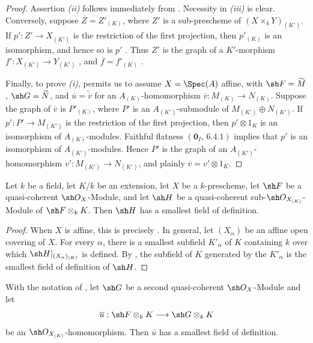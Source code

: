\begin{proof}
Assertion \emph{(ii)} follows immediately from .
Necessity in \emph{(iii)} is clear.
Conversely, suppose
$\overline Z=Z'_{(K)}$, where $Z'$ is a sub-prescheme of
$(X\times_kY)_{(K')}$.
If $p':Z'\to X_{(K')}$ is the restriction of the first projection,
then $p'_{(K)}$ is an isomorphism, and hence so is $p'$
.
Thus $Z'$ is the graph of a $K'$-morphism
$f':X_{(K')}\to Y_{(K')}$ , and
$\overline f=f'_{(K)}$ .

Finally, to prove \emph{(i)},  permits us to assume
$X=\Spec(A)$ affine, with $\sh F=\widetilde M$,
$\sh G=\widetilde N$, and
$\overline u=\widetilde{\overline v}$ for an
$A_{(K)}$-homomorphism
$\overline v:M_{(K)}\to N_{(K)}$.
Suppose the graph of $\overline v$ is
$P'_{(K)}$, where $P'$ is an $A_{(K')}$-submodule of
$M_{(K')}\oplus N_{(K')}$.
If $p':P'\to M_{(K')}$ is the restriction of the first projection,
then $p'\otimes1_K$ is an isomorphism of $A_{(K)}$-modules.
Faithful flatness $(\mathbf 0_I,\,6.4.1)$ implies that $p'$ is an
isomorphism of $A_{(K')}$-modules.
Hence $P'$ is the graph of an $A_{(K')}$-homomorphism
$v':M_{(K')}\to N_{(K')}$, and plainly
$\overline v=v'\otimes1_K$.
\end{proof}

\begin{proposition}[4.8.9]
\label{IV.4.8.9}
Let $k$ be a field, let $K/k$ be an extension, let $X$ be a
$k$-prescheme, let $\sh F$ be a quasi-coherent $\sh O_X$-Module, and
let $\sh H$ be a quasi-coherent sub-$\sh O_{X_{(K)}}$-Module of
$\sh F\otimes_kK$.
Then $\sh H$ has a smallest field of definition.
\end{proposition}

\begin{proof}
When $X$ is affine, this is precisely .
In general, let $(X_\alpha)$ be an affine open covering of $X$.
For every $\alpha$, there is a smallest subfield $K'_\alpha$ of $K$
containing $k$ over which
$\sh H|_{(X_\alpha)_{(K)}}$ is defined.
By , the subfield of $K$ generated by the
$K'_\alpha$ is the smallest field of definition of $\sh H$.
\end{proof}

\begin{corollary}[4.8.10]
\label{IV.4.8.10}
With the notation of , let $\sh G$ be a second
quasi-coherent $\sh O_X$-Module and let
\[
\overline u:\sh F\otimes_kK\longrightarrow\sh G\otimes_kK
\]
be an $\sh O_{X_{(K)}}$-homomorphism.
Then $\overline u$ has a smallest field of definition.
\end{corollary}

